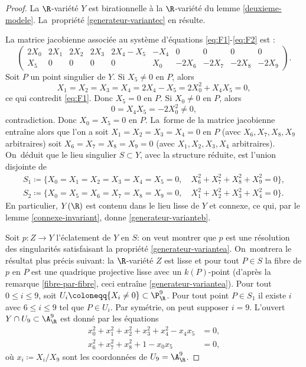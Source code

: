 \begin{proof}
La $\R$-variété $Y$ est birationnelle à la $\R$-variété du lemme \ref{deuxieme-modele}. La~propriété \eqref{generateur-variantec} en résulte.

La matrice jacobienne associée au système d'équations \eqref{eq:F1}-\eqref{eq:F2} est :
\[
 \begin{pmatrix} 2X_0 & 2X_1 & 2X_2 & 2X_3 & 2X_4-X_5 & -X_4 & 0 & 0 & 0 & 0 \\ X_5 & 0 & 0 & 0 & 0 & X_0 & -2X_6 & -2X_7 & -2X_8 & -2X_9 \end{pmatrix}. 
\]
Soit $P$ un point singulier de $Y$. Si $X_5\neq 0$ en $P$, alors
\[X_1=X_2=X_3=X_4=2X_4-X_5=2X_0^2+X_4X_5=0,\] ce qui contredit \eqref{eq:F1}. Donc $X_5=0$ en $P$. Si $X_0\neq 0$ en $P$, alors \[0=X_4X_5=-2X_0^2\neq 0,\] contradiction. Donc $X_0=X_5=0$ en $P$. La~forme de la matrice jacobienne entraîne alors que l'on a soit $X_1=X_2=X_3=X_4=0$ en $P$ (avec $X_6,X_7,X_8,X_9$ arbitraires) soit $X_6=X_7=X_8=X_9=0$ (avec $X_1,X_2,X_3,X_4$ arbitraires). On~déduit que le lieu singulier $S\subset Y$, avec la structure réduite, est l'union disjointe de
\begin{align*}
S_1\coloneqq \{ X_0=X_1=X_2=X_3=X_4=X_5=0, \quad X_6^2+X_7^2+X_8^2+X_9^2=0\},\\
S_2\coloneqq\{ X_0=X_5=X_6=X_7=X_8=X_9=0, \quad X_1^2+X_2^2+X_3^2+X_4^2=0\}.
\end{align*}
En particulier, $Y(\R)$ est contenu dans le lieu lisse de $Y$ et connexe, ce qui, par le lemme \ref{connexe-invariant}, donne \eqref{generateur-varianteb}.

Soit $p\colon Z\to Y$ l'éclatement de $Y$ en $S$: on veut montrer que $p$ est une résolution des singularités satisfaisant la propriété \eqref{generateur-variantea}. On~montrera le résultat plus précis suivant: la $\R$-variété $Z$ est lisse et pour tout $P\in S$ la fibre de $p$ en $P$ est une quadrique projective lisse avec un $k(P)$-point (d'après la remarque \ref{fibre-par-fibre}, ceci entraîne \eqref{generateur-variantea}). Pour tout $0\leq i\leq 9$, soit $U_i\coloneqq \{X_i\neq 0\}\subset \P^9_\R$. Pour tout point $P\in S_1$ il existe $i$ avec $6\leq i\leq 9$ tel que $P\in U_i$. Par symétrie, on peut supposer $i=9$. L'ouvert $Y\cap U_9\subset \A^9_\R$ est donné par les équations
\begin{align*}
x_0^2+x_1^2+x_2^2+x_3^2+x_4^2-x_4x_5 &= 0,\\
x_6^2+x_7^2+x_8^2+1-x_0x_5&= 0,
\end{align*}
où $x_i\coloneqq X_i/X_9$ sont les coordonnées de $U_9=\A^9_\R$.


\end{proof}
